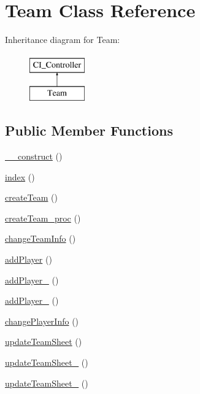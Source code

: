 \hypertarget{class_team}{}\section{Team Class Reference}
\label{class_team}
Inheritance diagram for Team\+:\begin{figure}[H]
\begin{center}
\leavevmode
\includegraphics[height=2.000000cm]{class_team}
\end{center}
\end{figure}
\subsection*{Public Member Functions}
\begin{DoxyCompactItemize}
\item 
\hyperlink{class_team_a095c5d389db211932136b53f25f39685}{\+\_\+\+\_\+construct} ()
\item 
\hyperlink{class_team_a149eb92716c1084a935e04a8d95f7347}{index} ()
\item 
\hyperlink{class_team_a36a67d958d920277b1e45be6a8d0227b}{create\+Team} ()
\item 
\hyperlink{class_team_a0e374aca34aaa9dedb6b141cb4289d9d}{create\+Team\+\_\+proc} ()
\item 
\hyperlink{class_team_a76ff99a950746cc52e5679f4c7b750ad}{change\+Team\+Info} ()
\item 
\hyperlink{class_team_a89d205383dce427906c6018364739647}{add\+Player} ()
\item 
\hyperlink{class_team_ac87c262ee4f896141056ded408007087}{add\+Player\+\_} ()
\item 
\hyperlink{class_team_a29080b41e053ae9ff6e9a407d9b2b680}{add\+Player\+\_} ()
\item 
\hyperlink{class_team_aa8b87de0247f7c9095d1dc2647218182}{change\+Player\+Info} ()
\item 
\hyperlink{class_team_a1feeb77d111e0f36eb096fe8fc07393a}{update\+Team\+Sheet} ()
\item 
\hyperlink{class_team_ac4ed7d27dfdc25d17bcb915dec01e6b2}{update\+Team\+Sheet\+\_} ()
\item 
\hyperlink{class_team_a370cca7f8e17ca3168d580e24eaaf8d8}{update\+Team\+Sheet\+\_} ()
\end{DoxyCompactItemize}
